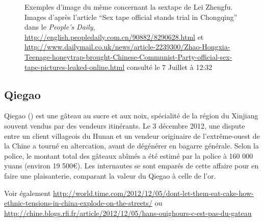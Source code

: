 \begin{figure}[h!]
    \hfill
    \hfill
    \caption{
      Exemples d'image du mème concernant la sextape de Lei Zhengfu. Images d'après l'article ``Sex tape official stands trial in Chongqing'' dans le \textit{People's Daily}, \url{http://english.peopledaily.com.cn/90882/8290628.html} et \url{http://www.dailymail.co.uk/news/article-2239300/Zhao-Hongxia-Teenage-honeytrap-brought-Chinese-Communist-Party-official-sex-tape-pictures-leaked-online.html} consulté le 7 Juillet à 12:32
    }
\end{figure}


\clearpage
\subsection*{Qiegao}

Qiegao () est une gâteau au sucre et aux noix, spécialité de la région du Xinjiang souvent vendus par des vendeurs itinérants. Le 3 décembre 2012, une dispute entre un client villageois du Hunan et un vendeur  originaire de l’extrême-ouest de la Chine a tourné en altercation, avant de dégénérer en bagarre générale. Selon la police, le montant total des gâteaux abîmés a été estimé par la police à 160 000 yuans (environ 19 500€). Les internautes se sont emparés de cette affaire pour en faire une plaisanterie, comparant la valeur du Qiegao à celle de l’or.

Voir également \url{http://world.time.com/2012/12/05/dont-let-them-eat-cake-how-ethnic-tensions-in-china-explode-on-the-streets/} ou \url{http://chine.blogs.rfi.fr/article/2012/12/05/hans-ouighours-c-est-pas-du-gateau}


